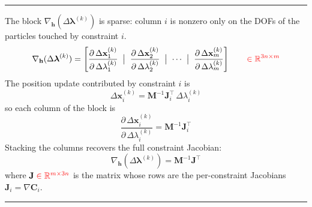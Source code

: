 \documentclass{article}
\newcommand{\pd}[2]{\dfrac{\partial\, #1}{\partial\, #2}}
\newcommand{\red}[1]{\textcolor{red}{#1}}
\begin{document}
\noindent\rule{\linewidth}{0.4pt}
\vspace{0.5ex}

The block $\nabla_\mathbf{h}(\Delta\boldsymbol{\lambda}^{(k)})$ is sparse: column $i$ is nonzero only on the DOFs of the particles touched by constraint $i$.
\begin{equation}
\nabla_\mathbf{h}(\Delta\boldsymbol{\lambda}^{(k)}) =
\left[
\pd{\Delta \mathbf{x}_1^{(k)}}{\Delta\lambda_1^{(k)}} \;\bigm\vert\;
\pd{\Delta \mathbf{x}_2^{(k)}}{\Delta\lambda_2^{(k)}} \;\bigm\vert\;
\cdots \;\bigm\vert\;
\pd{\Delta \mathbf{x}_m^{(k)}}{\Delta\lambda_m^{(k)}}
\right]
\qquad \red{\in \mathbb{R}^{3n \times m}}
\end{equation}
The position update contributed by constraint $i$ is
\begin{equation*}
    \Delta \mathbf{x}_i^{(k)} = \mathbf{M}^{-1}\mathbf{J}_i^{\top}\,\Delta \lambda_i^{(k)}
\end{equation*}
so each column of the block is
\begin{equation}
    \pd{\Delta \mathbf{x}_i^{(k)}}{\Delta \lambda_i^{(k)}} = \mathbf{M}^{-1}\mathbf{J}_i^{\top}
\end{equation}
Stacking the columns recovers the full constraint Jacobian:
\begin{equation}
    \nabla_\mathbf{h}(\Delta\boldsymbol{\lambda}^{(k)}) = \mathbf{M}^{-1}\mathbf{J}^\top
\end{equation}
where $\mathbf{J}\;\red{\in\mathbb{R}^{m\times3n}}$ is the matrix whose rows are the per-constraint Jacobians $\mathbf{J}_i = \nabla \mathbf{C}_i$.

\noindent\rule{\linewidth}{0.4pt}
\vspace{0.5ex}
\end{document}
